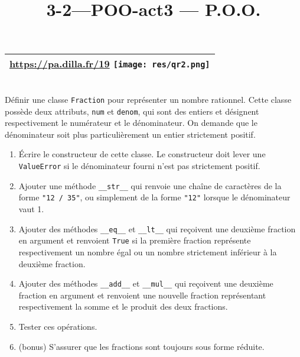 \documentclass[a4paper,17pt]{extarticle}
\title{3-2---POO-act}
\newenvironment{eleve}%
{\begin{activite}\color{noiramu}\\[-0.5cm]}
{\end{activite}}
\providecommand{\tightlist}{%
      \setlength{\itemsep}{0pt}\setlength{\parskip}{0pt}}
\begin{document}
    
    \title{3 --- P.O.O.}

    
    

    
    \begin{longtable}[]{@{}r@{}}
\toprule
\url{https://pa.dilla.fr/19}
\texttt{[image: res/qr2.png]}\tabularnewline
\midrule
\endhead
\bottomrule
\end{longtable}
\begin{eleve}
    Définir une classe \texttt{Fraction} pour représenter un nombre
rationnel. Cette classe possède deux attributs, \texttt{num} et
\texttt{denom}, qui sont des entiers et désignent respectivement le
numérateur et le dénominateur. On demande que le dénominateur soit plus
particulièrement un entier strictement positif.

\begin{enumerate}
\def\labelenumi{\arabic{enumi}.}
\tightlist
\item
  Écrire le constructeur de cette classe. Le constructeur doit lever une
  \texttt{ValueError} si le dénominateur fourni n'est pas strictement
  positif.
\item
  Ajouter une méthode \texttt{\_\_str\_\_} qui renvoie une chaîne de
  caractères de la forme \texttt{"12\ /\ 35"}, ou simplement de la forme
  \texttt{"12"} lorsque le dénominateur vaut 1.
\item
  Ajouter des méthodes \texttt{\_\_eq\_\_} et \texttt{\_\_lt\_\_} qui
  reçoivent une deuxième fraction en argument et renvoient \texttt{True}
  si la première fraction représente respectivement un nombre égal ou un
  nombre strictement inférieur à la deuxième fraction.
\item
  Ajouter des méthodes \texttt{\_\_add\_\_} et \texttt{\_\_mul\_\_} qui
  reçoivent une deuxième fraction en argument et renvoient une nouvelle
  fraction représentant respectivement la somme et le produit des deux
  fractions.
\item
  Tester ces opérations.
\item
  (bonus) S'assurer que les fractions sont toujours sous forme réduite.
\end{enumerate}
        
        \end{eleve}
\end{document}
